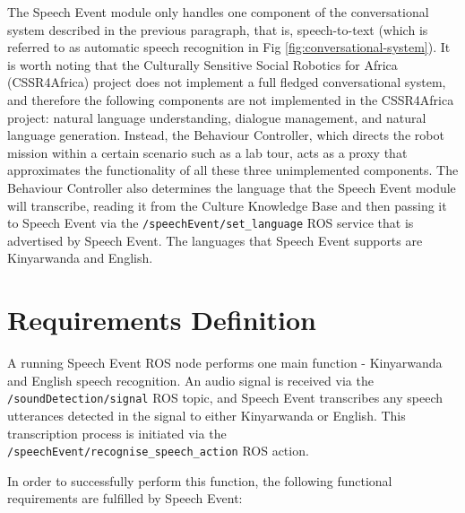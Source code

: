 \documentclass{CSSRforAfrica}
\begin{document}
The Speech Event module only handles one component of the conversational system described in the previous paragraph, that is, speech-to-text (which is referred to as automatic speech recognition in Fig \ref{fig:conversational-system}). It is worth noting that the Culturally Sensitive Social Robotics for Africa (CSSR4Africa) project does not implement a full fledged conversational system, and therefore the following components are not implemented in the CSSR4Africa project: natural language understanding, dialogue management, and natural language generation. Instead, the Behaviour Controller, which directs the robot mission within a certain scenario such as a lab tour, acts as a proxy that approximates the functionality of all these three unimplemented components. The Behaviour Controller also determines the language that the Speech Event module will transcribe, reading it from the Culture Knowledge Base and then passing it to Speech Event via the \texttt{/speechEvent/set\_language} ROS service that is advertised by Speech Event. The languages that Speech Event supports are Kinyarwanda and English.


\newpage
\section{Requirements Definition}
A running Speech Event ROS node performs one main function - Kinyarwanda and English speech recognition. An audio signal is received via the \texttt{/soundDetection/signal} ROS topic, and Speech Event transcribes any speech utterances detected in the signal to either Kinyarwanda or English. This transcription process is initiated via the \texttt{/speechEvent/recognise\_speech\_action} ROS action.

In order to successfully perform this function, the following functional requirements are fulfilled by Speech Event:
\end{document}
